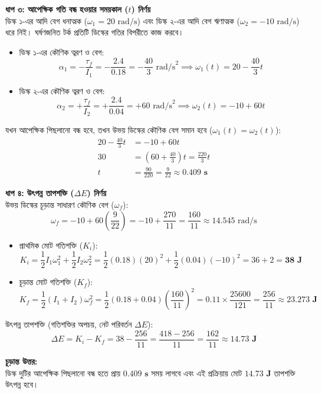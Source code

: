 \documentclass[12pt, a4paper]{article}
\begin{document}
\begin{tcolorbox}[solutionbox={সমাধান (Solution)}]
\vspace{0.5em}
\noindent
\textbf{ধাপ ৩: আপেক্ষিক গতি বন্ধ হওয়ার সময়কাল ($t$) নির্ণয়} \\
ডিস্ক ১-এর আদি বেগ ধনাত্মক ($\omega_1 = 20\text{ rad/s}$) এবং ডিস্ক ২-এর আদি বেগ ঋণাত্মক ($\omega_2 = -10\text{ rad/s}$) ধরে নিই। ঘর্ষণজনিত টর্ক প্রতিটি ডিস্কের গতির বিপরীতে কাজ করবে।
\begin{itemize}[leftmargin=*, parsep=0.5ex]
    \item ডিস্ক ১-এর কৌণিক ত্বরণ ও বেগ: 
    \[ \alpha_1 = -\frac{\tau_f}{I_1} = -\frac{2.4}{0.18} = -\frac{40}{3}\text{ rad/s}^2 \implies \omega_1(t) = 20 - \frac{40}{3}t \]
    \item ডিস্ক ২-এর কৌণিক ত্বরণ ও বেগ: 
    \[ \alpha_2 = +\frac{\tau_f}{I_2} = +\frac{2.4}{0.04} = +60\text{ rad/s}^2 \implies \omega_2(t) = -10 + 60t \]
\end{itemize}
যখন আপেক্ষিক পিছলানো বন্ধ হবে, তখন উভয় ডিস্কের কৌণিক বেগ সমান হবে ($\omega_1(t) = \omega_2(t)$):
\begin{align*}
    20 - \frac{40}{3}t &= -10 + 60t \\
    30 &= \left( 60 + \frac{40}{3} \right) t = \frac{220}{3} t \\
    t &= \frac{90}{220} = \frac{9}{22} \approx \mathbf{0.409\text{ s}}
\end{align*}

\vspace{0.5em}
\noindent
\textbf{ধাপ ৪: উৎপন্ন তাপশক্তি ($\Delta E$) নির্ণয়} \\
উভয় ডিস্কের চূড়ান্ত সাধারণ কৌণিক বেগ ($\omega_f$):
\[ \omega_f = -10 + 60\left(\frac{9}{22}\right) = -10 + \frac{270}{11} = \frac{160}{11} \approx 14.545\text{ rad/s} \]
\begin{itemize}[leftmargin=*, parsep=0.5ex]
    \item প্রাথমিক মোট গতিশক্তি ($K_i$): 
    \[ K_i = \frac{1}{2} I_1 \omega_1^2 + \frac{1}{2} I_2 \omega_2^2 = \frac{1}{2} (0.18) (20)^2 + \frac{1}{2} (0.04) (-10)^2 = 36 + 2 = \mathbf{38\text{ J}} \]
    \item চূড়ান্ত মোট গতিশক্তি ($K_f$): 
    \[ K_f = \frac{1}{2} (I_1 + I_2) \omega_f^2 = \frac{1}{2} (0.18 + 0.04) \left( \frac{160}{11} \right)^2 = 0.11 \times \frac{25600}{121} = \frac{256}{11} \approx \mathbf{23.273\text{ J}} \]
\end{itemize}
উৎপন্ন তাপশক্তি (গতিশক্তির অপচয়, নেট পরিবর্তন $\Delta E$):
\[ \Delta E = K_i - K_f = 38 - \frac{256}{11} = \frac{418 - 256}{11} = \frac{162}{11} \approx \mathbf{14.73\text{ J}} \]

\vspace{1em}
\begin{tcolorbox}[answerbox]
\textbf{চূড়ান্ত উত্তর:} \\
ডিস্ক দুটির আপেক্ষিক পিছলানো বন্ধ হতে প্রায় $\mathbf{0.409\text{ s}}$ সময় লাগবে এবং এই প্রক্রিয়ায় মোট $\mathbf{14.73\text{ J}}$ তাপশক্তি উৎপন্ন হবে।
\end{tcolorbox}
\end{tcolorbox}
\end{document}
